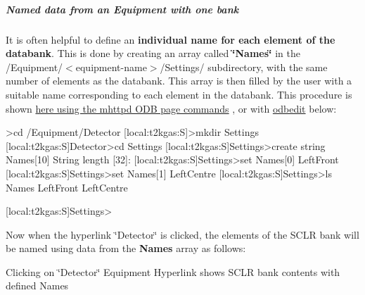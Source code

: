 \par


\par
\hypertarget{RC_mhttpd_Equipment_page_RC_mhttpd_Equipment_example2}{}\subparagraph{Named data from an Equipment with one bank}\label{RC_mhttpd_Equipment_page_RC_mhttpd_Equipment_example2}
It is often helpful to define an {\bfseries  individual name for each element of the databank}. This is done by creating an array called {\bfseries \char`\"{}Names\char`\"{}} in the /Equipment/$<$equipment-\/name$>$/Settings/ subdirectory, with the same number of elements as the databank. This array is then filled by the user with a suitable name corresponding to each element in the databank. This procedure is shown \hyperlink{RC_mhttpd_ODB_page_RC_mhttpd_ODB_page_example2}{here using the mhttpd ODB page commands} , or with \hyperlink{RC_odbedit_utility}{odbedit} below:


\begin{DoxyCode}
>cd /Equipment/Detector
[local:t2kgas:S]>mkdir Settings
[local:t2kgas:S]Detector>cd Settings
[local:t2kgas:S]Settings>create string Names[10]
String length [32]:
[local:t2kgas:S]Settings>set Names[0] LeftFront
[local:t2kgas:S]Settings>set Names[1] LeftCentre
[local:t2kgas:S]Settings>ls
Names
                                LeftFront
                                LeftCentre








[local:t2kgas:S]Settings>
\end{DoxyCode}
 \par
 Now when the hyperlink \char`\"{}Detector\char`\"{} is clicked, the elements of the SCLR bank will be named using data from the {\bfseries Names} array as follows: \par


\par
\par
\par
 \begin{center}  Clicking on \char`\"{}Detector\char`\"{} Equipment Hyperlink shows SCLR bank contents with defined Names \par
\par
\par
  \end{center}  \par
\par
\par


